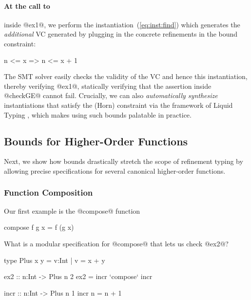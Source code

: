\paragraph{At the call to } inside @ex1@, we perform 
the instantiation~(\ref{eq:inst:find}) which generates the 
\emph{additional} VC generated by plugging in the concrete 
refinements in the bound constraint:
%
\begin{code}
    n <= x => n <= x + 1
\end{code}
%
The SMT solver easily checks the validity of the VC 
and hence this instantiation, thereby verifying @ex1@, 
\ie statically verifying that the assertion inside 
@checkGE@ cannot fail.
%
Crucially, we can also \emph{automatically synthesize} 
instantiations that satisfy the (Horn) constraint via 
the framework of Liquid Typing \cite{LiquidPLDI08}, 
which makes using such bounds palatable in practice.

\subsection{Bounds for Higher-Order Functions}


Next, we show how bounds drastically stretch the scope 
of refinement typing by allowing precise specifications 
for several canonical higher-order functions.

\subsubsection*{Function Composition}\label{sec:compose}

Our first example is the @compose@ function
%
\begin{code}
    compose f g x = f (g x)
\end{code}
%
What is a modular specification for @compose@ that lets us check @ex2@? 
%
\begin{code}
    type Plus x y = {v:Int | v = x + y}
    
    ex2    :: n:Int -> Plus n 2
    ex2    = incr `compose` incr 
    
    incr   :: n:Int -> Plus n 1
    incr n = n + 1 
\end{code}


